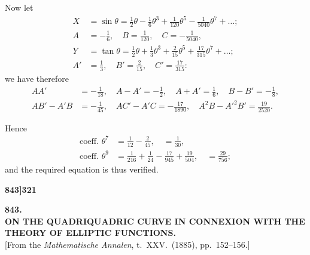 \documentclass[11pt,a4paper]{book}
\begin{document}
Now let
\begin{align*}
X &= \sin\theta = \tfrac{1}{2}\theta - \tfrac{1}{6}\theta^3 + \tfrac{1}{120}\theta^5 - \tfrac{1}{5040}\theta^7 + \ldots; \\
A &= -\tfrac{1}{6}, \quad B = \tfrac{1}{120}, \quad C = -\tfrac{1}{5040}, \\
Y &= \tan\theta = \tfrac{1}{2}\theta + \tfrac{1}{3}\theta^3 + \tfrac{2}{15}\theta^5 + \tfrac{17}{315}\theta^7 + \ldots; \\
A' &= \tfrac{1}{3}, \quad B' = \tfrac{2}{15}, \quad C' = \tfrac{17}{315}:
\end{align*}
we have therefore
\begin{align*}
AA' &= -\tfrac{1}{18}, \quad A - A' = -\tfrac{1}{2}, \quad A + A' = \tfrac{1}{6}, \quad B - B' = -\tfrac{1}{8}, \\
AB' - A'B &= -\tfrac{1}{45}, \quad AC' - A'C = -\tfrac{17}{1890}, \quad A^2B - A'^2B' = \tfrac{19}{2520}.
\end{align*}

Hence
\begin{align*}
\text{coeff. } \theta^7 &= \tfrac{1}{12} - \tfrac{2}{45}, \quad = \tfrac{1}{30}, \\
\text{coeff. } \theta^9 &= \tfrac{1}{216} + \tfrac{1}{24} - \tfrac{17}{945} + \tfrac{19}{504}, \quad = \tfrac{29}{756};
\end{align*}
and the required equation is thus verified.

\vspace{2em}


\newpage
\setcounter{page}{321}

\noindent\textbf{843]}\hfill\textbf{321}

\bigskip

\begin{center}
{\Large\textbf{843.}}\\[1em]
{\large\textbf{ON THE QUADRIQUADRIC CURVE IN CONNEXION WITH THE THEORY OF ELLIPTIC FUNCTIONS.}}\\[1em]
[From the \textit{Mathematische Annalen}, t.\ XXV.\ (1885), pp.\ 152--156.]
\end{center}

\bigskip
\end{document}
